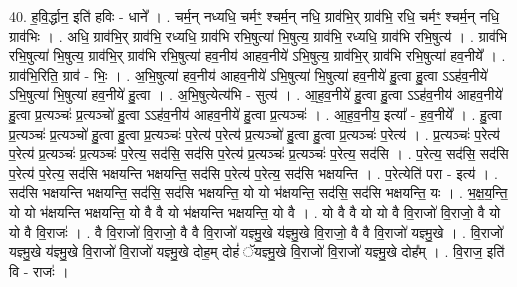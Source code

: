 \documentclass[17pt]{extarticle}
\begin{document}
40. ह॒वि॒र्द्धान॒ इति॑ हविः - धाने᳚ । . चर्म॒न् नध्यधि॒ चर्मꣳ॒॒ श्चर्म॒न् नधि॒ ग्राव॑भि॒र् ग्राव॑भि॒ रधि॒ चर्मꣳ॒॒ श्चर्म॒न् नधि॒ ग्राव॑भिः । . अधि॒ ग्राव॑भि॒र् ग्राव॑भि॒ रध्यधि॒ ग्राव॑भि रभि॒षुत्या॑ भि॒षुत्य॒ ग्राव॑भि॒ रध्यधि॒ ग्राव॑भि रभि॒षुत्य॑ । . ग्राव॑भि रभि॒षुत्या॑ भि॒षुत्य॒ ग्राव॑भि॒र् ग्राव॑भि रभि॒षुत्या॑ हव॒नीय॑ आहव॒नीये॑ ऽभि॒षुत्य॒ ग्राव॑भि॒र् ग्राव॑भि रभि॒षुत्या॑ हव॒नीये᳚ । . ग्राव॑भि॒रिति॒ ग्राव॑ - भिः॒ । . अ॒भि॒षुत्या॑ हव॒नीय॑ आहव॒नीये॑ ऽभि॒षुत्या॑ भि॒षुत्या॑ हव॒नीये॑ हु॒त्वा हु॒त्वा ऽऽह॑व॒नीये॑ ऽभि॒षुत्या॑ भि॒षुत्या॑ हव॒नीये॑ हु॒त्वा । . अ॒भि॒षुत्येत्य॑भि - सुत्य॑ । . आ॒ह॒व॒नीये॑ हु॒त्वा हु॒त्वा ऽऽह॑व॒नीय॑ आहव॒नीये॑ हु॒त्वा प्र॒त्यञ्चः॑ प्र॒त्यञ्चो॑ हु॒त्वा ऽऽह॑व॒नीय॑ आहव॒नीये॑ हु॒त्वा प्र॒त्यञ्चः॑ । . आ॒ह॒व॒नीय॒ इत्या᳚ - ह॒व॒नीये᳚ । . हु॒त्वा प्र॒त्यञ्चः॑ प्र॒त्यञ्चो॑ हु॒त्वा हु॒त्वा प्र॒त्यञ्चः॑ प॒रेत्य॑ प॒रेत्य॑ प्र॒त्यञ्चो॑ हु॒त्वा हु॒त्वा प्र॒त्यञ्चः॑ प॒रेत्य॑ । . प्र॒त्यञ्चः॑ प॒रेत्य॑ प॒रेत्य॑ प्र॒त्यञ्चः॑ प्र॒त्यञ्चः॑ प॒रेत्य॒ सद॑सि॒ सद॑सि प॒रेत्य॑ प्र॒त्यञ्चः॑ प्र॒त्यञ्चः॑ प॒रेत्य॒ सद॑सि । . प॒रेत्य॒ सद॑सि॒ सद॑सि प॒रेत्य॑ प॒रेत्य॒ सद॑सि भक्षयन्ति भक्षयन्ति॒ सद॑सि प॒रेत्य॑ प॒रेत्य॒ सद॑सि भक्षयन्ति । . प॒रेत्येति॑ परा - इत्य॑ । . सद॑सि भक्षयन्ति भक्षयन्ति॒ सद॑सि॒ सद॑सि भक्षयन्ति॒ यो यो भ॑क्षयन्ति॒ सद॑सि॒ सद॑सि भक्षयन्ति॒ यः । . भ॒क्ष॒य॒न्ति॒ यो यो भ॑क्षयन्ति भक्षयन्ति॒ यो वै वै यो भ॑क्षयन्ति भक्षयन्ति॒ यो वै । . यो वै वै यो यो वै वि॒राजो॑ वि॒राजो॒ वै यो यो वै वि॒राजः॑ । . वै वि॒राजो॑ वि॒राजो॒ वै वै वि॒राजो॑ यज्ञ्मु॒खे य॑ज्ञ्मु॒खे वि॒राजो॒ वै वै वि॒राजो॑ यज्ञ्मु॒खे । . वि॒राजो॑ यज्ञ्मु॒खे य॑ज्ञ्मु॒खे वि॒राजो॑ वि॒राजो॑ यज्ञ्मु॒खे दोह॒म् दोहं॑ ॅयज्ञ्मु॒खे वि॒राजो॑ वि॒राजो॑ यज्ञ्मु॒खे दोह᳚म् । . वि॒राज॒ इति॑ वि - राजः॑ । \newline
\end{document}
